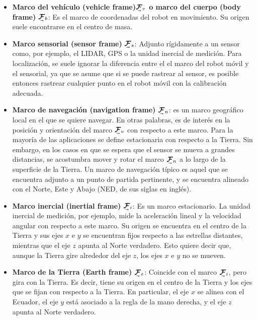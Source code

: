 \begin{itemize}
    \item \textbf{Marco del vehículo (vehicle frame)$\undervec{\bm{\mathcal{F}}}_v$ o marco del cuerpo (body frame)} $\undervec{\bm{\mathcal{F}}}_b$: Es el marco de coordenadas del robot en movimiento. Su origen suele encontrarse en el centro de masa.
    \item \textbf{Marco sensorial (sensor frame)} $\undervec{\bm{\mathcal{F}}}_s$: Adjunto rígidamente a un sensor como, por ejemplo, el LIDAR, GPS o la unidad inercial de medición. Para localización, se suele ignorar la diferencia entre el el marco del robot móvil y el sensorial, ya que se asume que si se puede rastrear al sensor, es posible entonces rastrear cualquier punto en el robot móvil con la calibración adecuada.
    \item \textbf{Marco de navegación (navigation frame)} $\undervec{\bm{\mathcal{F}}}_n$: es un marco geográfico local en el que se quiere navegar. En otras palabras, es de interés en la posición y orientación del marco $\undervec{\bm{\mathcal{F}}}_v$ con respecto a este marco. Para la mayoría de las aplicaciones se define estacionaria con respecto a la Tierra. Sin embargo, en los casos en que se espera que el sensor se mueva a grandes distancias, se acostumbra mover y rotar el marco $\undervec{\bm{\mathcal{F}}}_n$ a lo largo de la superficie de la Tierra. Un marco de navegación típico es aquel que se encuentra adjunto a un punto de partida pertinente, y se encuentra alineado con el Norte, Este y Abajo (NED, de sus siglas en inglés).
    \item \textbf{Marco inercial (inertial frame)} $\undervec{\bm{\mathcal{F}}}_i$: Es un marco estacionario. La unidad inercial de medición, por ejemplo, mide la aceleración lineal y la velocidad angular con respecto a este marco. Su origen se encuentra en el centro de la Tierra y sus ejes $x$ e $y$ se encuentran fijos respecto a las estrellas distantes, mientras que el eje $z$ apunta al Norte verdadero. Esto quiere decir que, aunque la Tierra gire alrededor del eje $z$, los ejes $x$ e $y$ no se mueven.
    \item \textbf{Marco de la Tierra (Earth frame)} $\undervec{\bm{\mathcal{F}}}_e$: Coincide con el marco $\undervec{\bm{\mathcal{F}}}_i$, pero gira con la Tierra. Es decir, tiene su origen en el centro de la Tierra y los ejes que se fijan con respecto a la Tierra. En particular, el eje $x$ se alinea con el Ecuador, el eje $y$ está asociado a la regla de la mano derecha, y el eje $z$ apunta al Norte verdadero.
\end{itemize}

